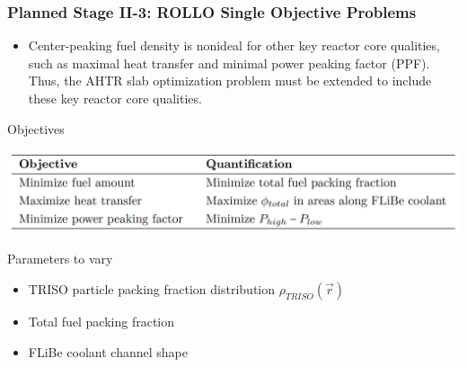 \begin{frame}
    \frametitle{Planned Stage II-3: ROLLO Single Objective Problems}
    \begin{itemize}
        \item Center-peaking fuel density is nonideal for other key reactor core 
        qualities, such as maximal heat transfer and minimal power peaking factor (PPF).
        Thus, the AHTR slab optimization problem must be extended to include 
        these key reactor core qualities. 
    \end{itemize}
    \begin{block}{Objectives}
        \vspace{-0.2cm}
    \begin{table}
        \caption{ROLLO optimization problem objectives with their quantification 
        descriptions.}
        \includegraphics[width=0.7\linewidth]{figures/opt-obj.png}
    \end{table}
\end{block}
\vspace{-0.5cm}
\begin{block}{Parameters to vary}
    \begin{itemize}
        \item TRISO particle packing fraction distribution $\rho_{TRISO}(\vec{r})$
        \item Total fuel packing fraction
        \item FLiBe coolant channel shape 
    \end{itemize}
\end{block}
\end{frame}
